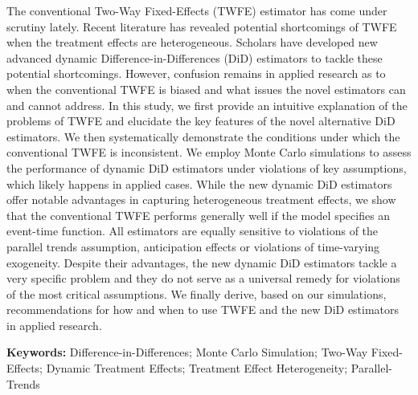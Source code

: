 The conventional Two-Way Fixed-Effects (TWFE) estimator has come under scrutiny lately. Recent literature has revealed potential shortcomings of TWFE when the treatment effects are heterogeneous. Scholars have developed new advanced dynamic Difference-in-Differences (DiD) estimators to tackle these potential shortcomings. However, confusion remains in applied research as to when the conventional TWFE is biased and what issues the novel estimators can and cannot address. In this study, we first provide an intuitive explanation of the problems of TWFE and elucidate the key features of the novel alternative DiD estimators. We then systematically demonstrate the conditions under which the conventional TWFE is inconsistent. We employ Monte Carlo simulations to assess the performance of dynamic DiD estimators under violations of key assumptions, which likely happens in applied cases. While the new dynamic DiD estimators offer notable advantages in capturing heterogeneous treatment effects, we show that the conventional TWFE performs generally well if the model specifies an event-time function. All estimators are equally sensitive to violations of the parallel trends assumption, anticipation effects or violations of time-varying exogeneity. Despite their advantages, the new dynamic DiD estimators tackle a very specific problem and they do not serve as a universal remedy for violations of the most critical assumptions. We finally derive, based on our simulations, recommendations for how and when to use TWFE and the new DiD estimators in applied research.

\bigskip\noindent\textbf{Keywords:} Difference-in-Differences; Monte Carlo Simulation; Two-Way Fixed-Effects; Dynamic Treatment Effects; Treatment Effect Heterogeneity; Parallel-Trends